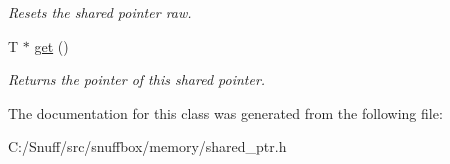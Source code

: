 \begin{DoxyCompactItemize}
\begin{DoxyCompactList}\small\item\em Resets the shared pointer raw. \end{DoxyCompactList}\item 
\hypertarget{classsnuffbox_1_1_shared_ptr_a8e905bc2778ea582cc6b052ccfeec2c2}{T $\ast$ \hyperlink{classsnuffbox_1_1_shared_ptr_a8e905bc2778ea582cc6b052ccfeec2c2}{get} ()}\label{classsnuffbox_1_1_shared_ptr_a8e905bc2778ea582cc6b052ccfeec2c2}

\begin{DoxyCompactList}\small\item\em Returns the pointer of this shared pointer. \end{DoxyCompactList}\end{DoxyCompactItemize}


The documentation for this class was generated from the following file\-:\begin{DoxyCompactItemize}
\item 
C\-:/\-Snuff/src/snuffbox/memory/shared\-\_\-ptr.\-h\end{DoxyCompactItemize}
